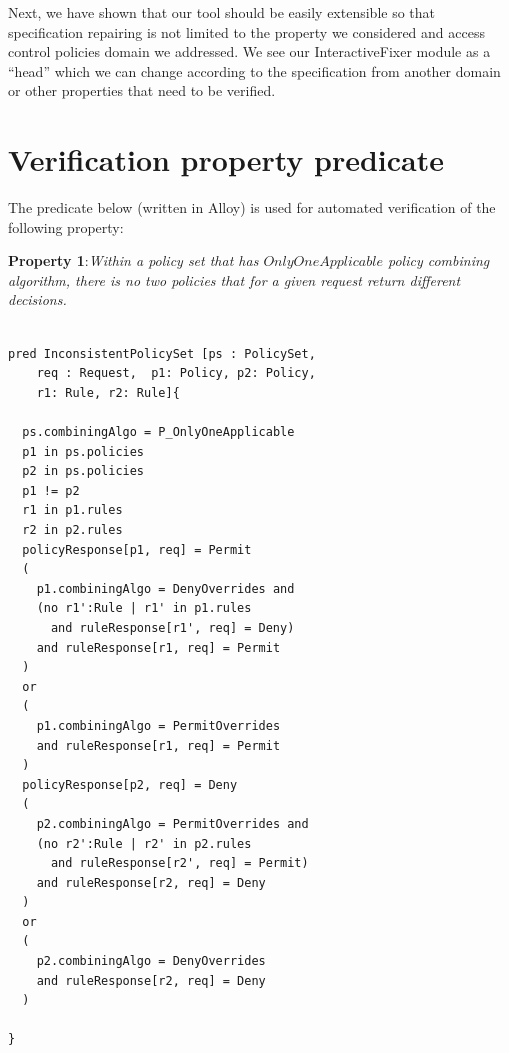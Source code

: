 \documentclass{acm_proc_article-sp}
\begin{document}
Next, we have shown that our tool should be easily extensible so that specification repairing is not limited to the property we considered and access control policies domain we addressed. We see our InteractiveFixer module as a ``head'' which we can change according to the specification from another domain or other properties that need to be verified. 


{}


\appendix
\section{Verification property predicate} \label{appendix:A}

The predicate below (written in Alloy) is used for automated verification of the following property:

\textbf{Property 1}:\textit{Within a policy set that has $OnlyOneApplicable$ policy combining algorithm, there is no two policies that for a given request return different decisions.}

\begin{verbatim}

pred InconsistentPolicySet [ps : PolicySet, 
    req : Request,  p1: Policy, p2: Policy, 
    r1: Rule, r2: Rule]{

  ps.combiningAlgo = P_OnlyOneApplicable 
  p1 in ps.policies
  p2 in ps.policies
  p1 != p2
  r1 in p1.rules
  r2 in p2.rules
  policyResponse[p1, req] = Permit
  (
    p1.combiningAlgo = DenyOverrides and
    (no r1':Rule | r1' in p1.rules 
      and ruleResponse[r1', req] = Deny)
    and ruleResponse[r1, req] = Permit
  )
  or
  (
    p1.combiningAlgo = PermitOverrides
    and ruleResponse[r1, req] = Permit
  )
  policyResponse[p2, req] = Deny
  (
    p2.combiningAlgo = PermitOverrides and
    (no r2':Rule | r2' in p2.rules 
      and ruleResponse[r2', req] = Permit)
    and ruleResponse[r2, req] = Deny
  )
  or
  (
    p2.combiningAlgo = DenyOverrides
    and ruleResponse[r2, req] = Deny
  )

}

\end{verbatim}



\balancecolumns
\end{document}
